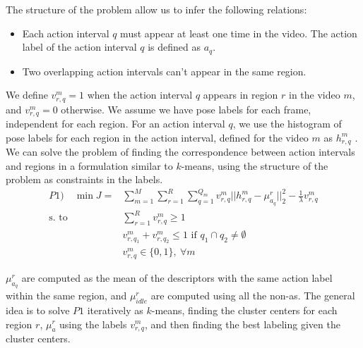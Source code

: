 \documentclass[11pt,letterpaper]{article}
\newcommand{\+}[1]{\ensuremath{{\boldsymbol #1}}}
\begin{document}
The structure of the problem allow us to infer the following relations:
\begin{itemize}
\item Each action interval $q$ must appear at least one time in the video. The action label of the action interval $q$ is defined as $a_q$.
\item Two overlapping action intervals can't appear in the same region.
\end{itemize}
We define $v_{r,q}^m=1$ when the action interval $q$ appears in region $r$ in the video $m$, and $v_{r,q}^m=0$ otherwise. We assume we have pose labels for each frame, independent for each region. For an action interval $q$, we use the histogram of pose labels for each region in the action interval, defined for the video $m$ as $h_{r,q}^m$ . We can solve the problem of finding the correspondence between action intervals and regions in a formulation similar to $k$-means, using the structure of the problem as constraints in the labels. 
\begin{equation}
\begin{split}
P1) \quad \min J= &\sum_{m=1}^M  \sum_{r=1}^R \sum_{q=1}^{Q_m}  v_{r,q}^m || h_{r,q}^m - \mu_{a_q}^r||_2^2 -\frac{1}{\lambda} v_{r,q}^m\\ 
 \text{s. to} 
\quad 
& \sum_{r=1}^R v_{r,q}^m \ge 1 \\ 
& v_{r,q_1}^m + v_{r,q_2}^m \le 1 \text{ if } q_1\cap q_2 \neq \emptyset \\  
& v_{r,q}^m \in \{0,1\},~\forall m
\end{split}
\end{equation}
 
$\mu_{a_q}^r$ are computed as the mean of the descriptors with the same action label within the same region, and $\mu_{idle}^r$ are computed using all the non-as. The general idea is to solve $P1$ iteratively as $k$-means,  finding the cluster centers for each region $r$, $\mu_{a}^r$ using the labels $v_{r,q}^m$, and then finding the best labeling given the cluster centers.
\end{document}
